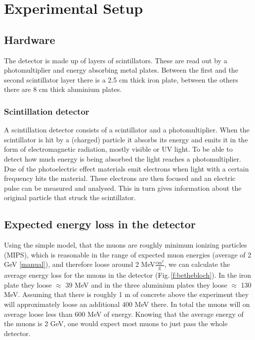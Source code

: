 \section{Experimental Setup}

\subsection{Hardware}
The detector is made up of layers of scintillators. These are read out by a photomultiplier and energy absorbing metal plates. Between the first and the second scintillator layer there is a 2.5 cm thick iron plate, between the others there are 8 cm thick aluminium plates.

\subsubsection{Scintillation detector}
A scintillation detector consists of a scintillator and a photomultiplier. When the scintillator is hit by a (charged) particle it absorbs its energy and emits it in the form of electromagnetic radiation, mostly visible or UV light.  To be able to detect how much energy is being absorbed the light reaches a photomultiplier. Due of the photoelectric effect materials emit electrons when light with a certain frequency hits the material. These electrons are then focused and an electric pulse can be measured and analysed. This in turn gives information about the original particle that struck the scintillator. 

\subsection{Expected energy loss in the detector}
Using the simple model, that the muons are roughly minimum ionizing particles (MIPS), which is reasonable in the range of expected muon energies (average of 2 GeV \ref{manual}), and therefore loose around 2 MeV$\frac{\text{cm}^2}{\text{g}}$, we can calculate the average energy loss for the muons in the detector (Fig.\,\ref{f:bethebloch}). In the iron plate they loose $\approx$ 39 MeV and in the three aluminium plates they loose $\approx$ 130 MeV. Assuming that there is roughly 1 m of concrete above the experiment they will approximately loose an additional 400 MeV there. In total the muons will on average loose less than 600 MeV of energy. Knowing that the average energy of the muons is 2 GeV, one would expect most muons to just pass the whole detector. 



